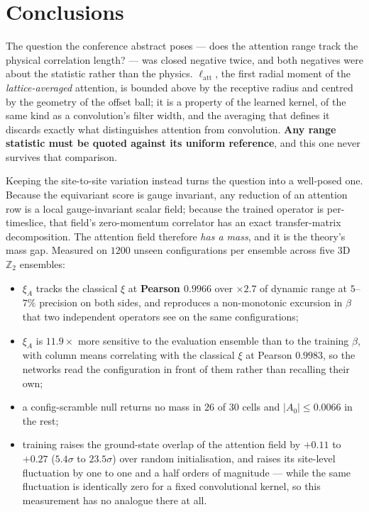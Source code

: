 \documentclass[11pt,a4paper]{article}
\newcommand{\latt}{\ell_{\mathrm{att}}}
\newcommand{\xiA}{\xi_A}
\begin{document}
\section{Conclusions}
\label{sec:conclusions}

The question the conference abstract poses --- does the attention range track
the physical correlation length? --- was closed negative twice, and both
negatives were about the statistic rather than the physics. $\latt$, the first
radial moment of the \emph{lattice-averaged} attention, is bounded above by the
receptive radius and centred by the geometry of the offset ball; it is a
property of the learned kernel, of the same kind as a convolution's filter
width, and the averaging that defines it discards exactly what distinguishes
attention from convolution. \textbf{Any range statistic must be quoted against
its uniform reference}, and this one never survives that comparison.

Keeping the site-to-site variation instead turns the question into a
well-posed one. Because the equivariant score is gauge invariant, any reduction
of an attention row is a local gauge-invariant scalar field; because the trained
operator is per-timeslice, that field's zero-momentum correlator has an exact
transfer-matrix decomposition. The attention field therefore \emph{has a mass},
and it is the theory's mass gap. Measured on $1200$ unseen configurations per
ensemble across five 3D $\mathbb{Z}_2$ ensembles:

\begin{itemize}
  \item $\xiA$ tracks the classical $\xi$ at \textbf{Pearson $0.9966$} over
        $\times2.7$ of dynamic range at $5$--$7\%$ precision on both sides, and
        reproduces a non-monotonic excursion in $\beta$ that two independent
        operators see on the same configurations;
  \item $\xiA$ is $\mathbf{11.9\times}$ more sensitive to the evaluation
        ensemble than to the training $\beta$, with column means correlating
        with the classical $\xi$ at Pearson $0.9983$, so the networks read the
        configuration in front of them rather than recalling their own;
  \item a config-scramble null returns no mass in $26$ of $30$ cells and
        $|A_0| \le 0.0066$ in the rest;
  \item training raises the ground-state overlap of the attention field by
        $+0.11$ to $+0.27$ ($5.4\sigma$ to $23.5\sigma$) over random
        initialisation, and raises its site-level fluctuation by one to one and
        a half orders of magnitude --- while the same fluctuation is identically
        zero for a fixed convolutional kernel, so this measurement has no
        analogue there at all.
\end{itemize}
\end{document}

